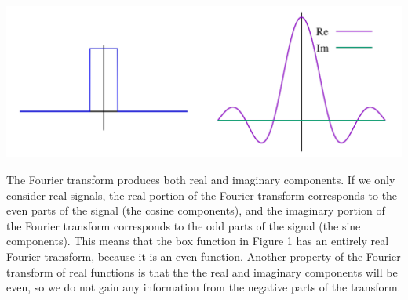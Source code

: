 \documentclass[12pt]{article}
\begin{document}
\begin{minipage}{\textwidth}
  \centering
  \includegraphics[trip=0 0 0, clip, scale=0.2]{fourier_transform}
\end{minipage}

The Fourier transform produces both real and imaginary components. If we only consider real signals, the real portion of the Fourier transform corresponds to the even parts of the signal (the cosine components), and the imaginary portion of the Fourier transform corresponds to the odd parts of the signal (the sine components). This means that the box function in Figure 1 has an entirely real Fourier transform, because it is an even function. Another property of the Fourier transform of real functions is that the the real and imaginary components will be even, so we do not gain any information from the negative parts of the transform.
\end{document}
